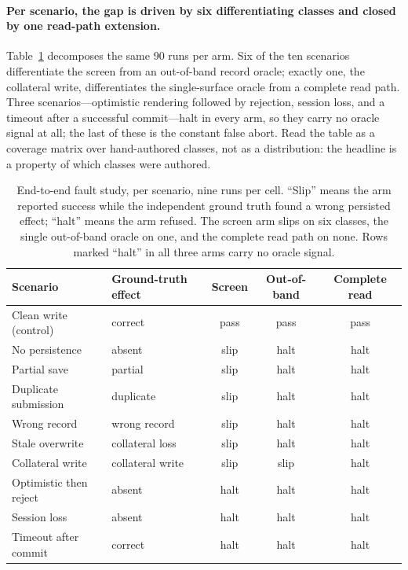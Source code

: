 \paragraph{Per scenario, the gap is driven by six differentiating classes and
closed by one read-path extension.} Table~\ref{tab:e2eclasses} decomposes the
same 90 runs per arm. Six of the ten scenarios differentiate the screen from an
out-of-band record oracle; exactly one, the collateral write, differentiates the
single-surface oracle from a complete read path. Three scenarios---optimistic
rendering followed by rejection, session loss, and a timeout after a successful
commit---halt in every arm, so they carry no oracle signal at all; the last of
these is the constant false abort. Read the table as a coverage matrix over
hand-authored classes, not as a distribution: the headline is a property of
which classes were authored.

\begin{table}[t]
\centering
\caption{End-to-end fault study, per scenario, nine runs per cell. ``Slip''
means the arm reported success while the independent ground truth found a wrong
persisted effect; ``halt'' means the arm refused. The screen arm slips on six
classes, the single out-of-band oracle on one, and the complete read path on
none. Rows marked ``halt'' in all three arms carry no oracle signal.}
\label{tab:e2eclasses}
\small
\begin{tabular}{llccc}
\toprule
Scenario & Ground-truth effect & Screen & Out-of-band & Complete read \\
\midrule
Clean write (control)    & correct          & pass & pass & pass \\
No persistence           & absent           & slip & halt & halt \\
Partial save             & partial          & slip & halt & halt \\
Duplicate submission     & duplicate        & slip & halt & halt \\
Wrong record             & wrong record     & slip & halt & halt \\
Stale overwrite          & collateral loss  & slip & halt & halt \\
Collateral write         & collateral write & slip & slip & halt \\
Optimistic then reject   & absent           & halt & halt & halt \\
Session loss             & absent           & halt & halt & halt \\
Timeout after commit     & correct          & halt & halt & halt \\
\bottomrule
\end{tabular}
\end{table}

